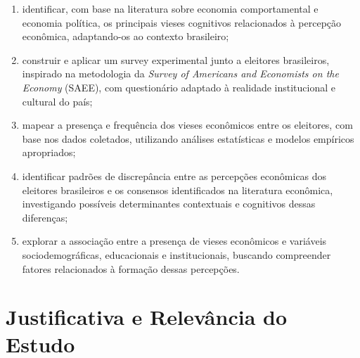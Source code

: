 \begin{enumerate}[label=\alph*)]
    \item \label{obj:a} identificar, com base na literatura sobre economia comportamental e economia política, os principais vieses cognitivos relacionados à percepção econômica, adaptando-os ao contexto brasileiro;

    \item \label{obj:b} construir e aplicar um survey experimental junto a eleitores brasileiros, inspirado na metodologia da \textit{Survey of Americans and Economists on the Economy} (SAEE), com questionário adaptado à realidade institucional e cultural do país;

    \item \label{obj:c} mapear a presença e frequência dos vieses econômicos entre os eleitores, com base nos dados coletados, utilizando análises estatísticas e modelos empíricos apropriados;

    \item \label{obj:d} identificar padrões de discrepância entre as percepções econômicas dos eleitores brasileiros e os consensos identificados na literatura econômica, investigando possíveis determinantes contextuais e cognitivos dessas diferenças;

    \item \label{obj:e} explorar a associação entre a presença de vieses econômicos e variáveis sociodemográficas, educacionais e institucionais, buscando compreender fatores relacionados à formação dessas percepções.
\end{enumerate}


\section{Justificativa e Relevância do Estudo}


